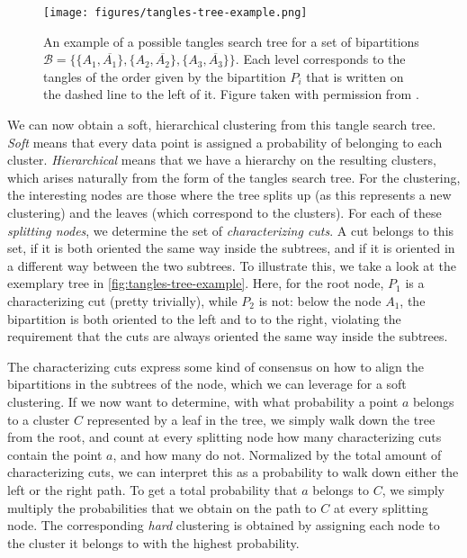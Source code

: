 \begin{figure}[h]
    \centering
    \texttt{[image: figures/tangles-tree-example.png]}
    \caption{An example of a possible tangles search tree for a set of bipartitions $\mathcal{B} = \{\{A_1, \overline{A_1}\}, \{A_2, \overline{A_2}\}, \{A_3, \overline{A_3}\} \}$. 
        Each level corresponds to the tangles of the order given by the bipartition $P_i$ that is written on the dashed line to the left of it.
        Figure taken with permission from \cite{klepperClusteringTanglesAlgorithmic2021}.}
    \label{fig:tangles-tree-example}
\end{figure}

We can now obtain a soft, hierarchical clustering from this tangle search tree. \textit{Soft} means that every data point is assigned
a probability of belonging to each cluster. \textit{Hierarchical} means that we have a hierarchy on the resulting clusters, which arises naturally
from the form of the tangles search tree. For the clustering, the interesting nodes are those
where the tree splits up (as this represents a new clustering) and the leaves (which correspond to the clusters). 
For each of these \textit{splitting nodes}, we determine the set of \textit{characterizing cuts}.
A cut belongs to this set, if it is both oriented the same way inside the subtrees, and if it is oriented in a different way between the two subtrees.
To illustrate this, we take a look at the exemplary tree in \autoref{fig:tangles-tree-example}. Here, for the root node, $P_1$ is a characterizing cut (pretty trivially),
while $P_2$ is not: below the node $A_1$, the bipartition is both oriented to the left and to to the right, violating the requirement that the cuts are always oriented
the same way inside the subtrees. 

The characterizing cuts express some kind of consensus on how to align the bipartitions in the subtrees of the node, which we can leverage 
for a soft clustering. If we now want to determine, with what probability a point $a$ belongs to a cluster $C$ represented by a leaf in the tree, we simply walk down 
the tree from the root, and count at every splitting node how many characterizing cuts contain the point $a$, and how many do not. Normalized by the total amount of
characterizing cuts, we can interpret this as a probability to walk down either the left or the right path. To get a total probability that $a$ belongs to $C$, 
we simply multiply the probabilities that we obtain on the path to $C$ at every splitting node. The corresponding \textit{hard} clustering is obtained by assigning each
node to the cluster it belongs to with the highest probability.
    
